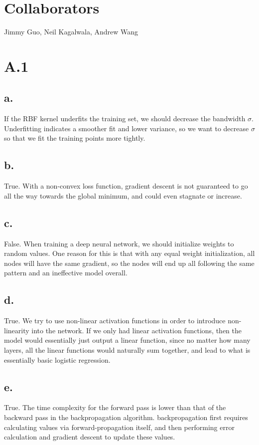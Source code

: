 \documentclass{article}
\date{{}}
\newcommand{\1}{\mathbf{1}}
\begin{document}
\thispagestyle{firstpageheader}

\section*{Collaborators}
{\Large 
Jimmy Guo, Neil Kagalwala, Andrew Wang
}
\section*{A.1}
{\Large 

\subsection*{a.}

If the RBF kernel underfits the training set, we should decrease the bandwidth $\sigma$. Underfitting indicates a smoother fit and lower variance, so we want to decrease $\sigma$ so that we fit the training points more tightly.

\subsection*{b.}

True. With a non-convex loss function, gradient descent is not guaranteed to go all the way towards the global minimum, and could even stagnate or increase.

\subsection*{c.}

False. When training a deep neural network, we should initialize weights to random values. One reason for this is that with any equal weight initialization, all nodes will have the same gradient, so the nodes will end up all following the same pattern and an ineffective model overall.

\subsection*{d.}

True. We try to use non-linear activation functions in order to introduce non-linearity into the network. If we only had linear activation functions, then the model would essentially just output a linear function, since no matter how many layers, all the linear functions would naturally sum together, and lead to what is essentially basic logistic regression.

\subsection*{e.}

True. The time complexity for the forward pass is lower than that of the backward pass in the backpropagation algorithm. backpropagation first requires calculating values via forward-propagation itself, and then performing error calculation and gradient descent to update these values.

}
\end{document}
